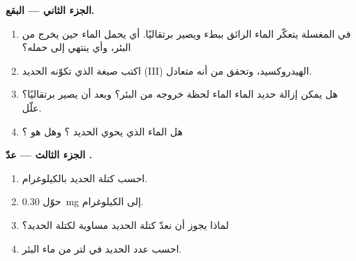 \begin{problem}
\medskip
\noindent\textbf{الجزء الثاني --- البقع.}
\begin{enumerate}[resume]
  \item في المغسلة يتعكّر الماء الرائق ببطء ويصير برتقاليًا. أي  يحمل
        الماء حين يخرج من البئر، وأي  ينتهي إلى
        حمله؟
  \item اكتب صيغة  الذي تكوّنه  الحديد (III)
         الهيدروكسيد، وتحقق من أنه متعادل.
  \item هل يمكن إزالة حديد الماء  الماء لحظة خروجه من البئر؟
        وبعد أن يصير برتقاليًا؟ علّل.
  \item هل الماء الذي يحوي  الحديد ؟ وهل هو ؟
\end{enumerate}

\medskip
\noindent\textbf{الجزء الثالث --- عدّ .}
\begin{enumerate}[resume]
  \item احسب كتلة  الحديد بالكيلوغرام.
  \item حوّل \qty{0.30}{mg} إلى الكيلوغرام.
  \item لماذا يجوز أن نعدّ كتلة  الحديد مساوية لكتلة 
        الحديد؟
  \item احسب عدد  الحديد في لتر من ماء البئر.
\end{enumerate}
\end{problem}
